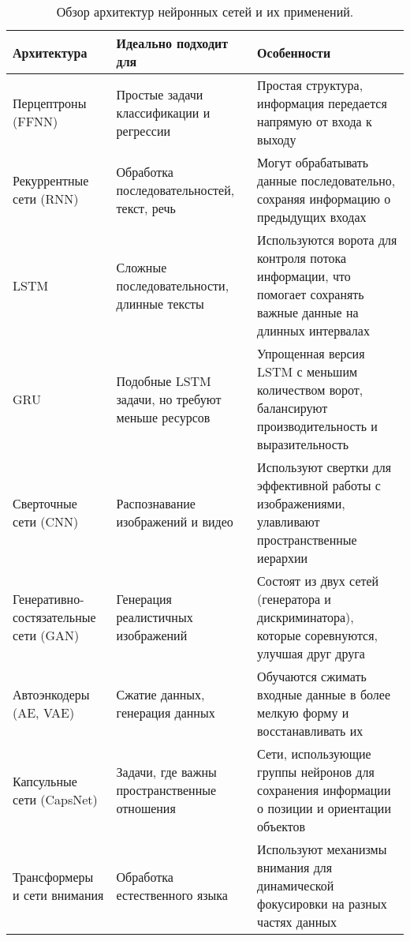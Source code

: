 \begin{table}[h]
	\centering
	{\footnotesize
		\begin{tabular}{|>{\raggedright\arraybackslash}p{4.5cm}|>{\raggedright\arraybackslash}p{5.5cm}|>{\raggedright\arraybackslash}p{7cm}|}
			\hline
			\textbf{Архитектура} & \textbf{Идеально подходит для} & \textbf{Особенности} \\
			\hline
			Перцептроны (FFNN) & Простые задачи классификации и регрессии & Простая структура, информация передается напрямую от входа к выходу \\
			\hline
			Рекуррентные сети (RNN) & Обработка последовательностей, текст, речь & Могут обрабатывать данные последовательно, сохраняя информацию о предыдущих входах \\
			\hline
			LSTM & Сложные последовательности, длинные тексты & Используются ворота для контроля потока информации, что помогает сохранять важные данные на длинных интервалах \\
			\hline
			GRU & Подобные LSTM задачи, но требуют меньше ресурсов & Упрощенная версия LSTM с меньшим количеством ворот, балансируют производительность и выразительность \\
			\hline
			Сверточные сети (CNN) & Распознавание изображений и видео & Используют свертки для эффективной работы с изображениями, улавливают пространственные иерархии \\
			\hline
			Генеративно-состязательные сети (GAN) & Генерация реалистичных изображений & Состоят из двух сетей (генератора и дискриминатора), которые соревнуются, улучшая друг друга \\
			\hline
			Автоэнкодеры (AE, VAE) & Сжатие данных, генерация данных & Обучаются сжимать входные данные в более мелкую форму и восстанавливать их \\
			\hline
			Капсульные сети (CapsNet) & Задачи, где важны пространственные отношения & Сети, использующие группы нейронов для сохранения информации о позиции и ориентации объектов \\
			\hline
			Трансформеры и сети внимания & Обработка естественного языка & Используют механизмы внимания для динамической фокусировки на разных частях данных \\
			\hline
		\end{tabular}
	}
	\caption{Обзор архитектур нейронных сетей и их применений.}
	\label{tab:ArchitecturesTable}
\end{table}